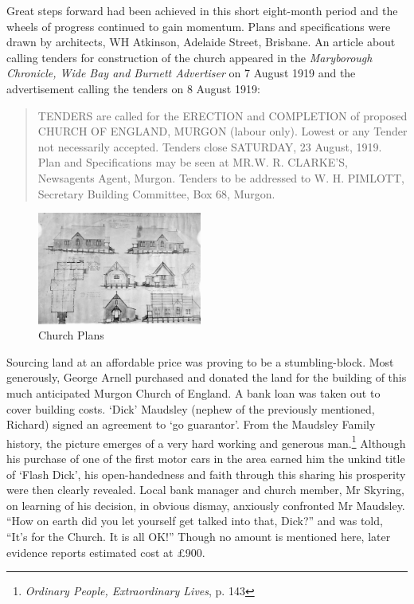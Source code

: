 Great steps forward had been achieved in this short eight-month period
and the wheels of progress continued to gain momentum. Plans and
specifications were drawn by architects, WH Atkinson, Adelaide Street,
Brisbane. An article about calling tenders for construction of the
church appeared in the \emph{Maryborough Chronicle, Wide Bay and Burnett
Advertiser} on 7 August 1919 and the advertisement calling the tenders
on 8 August 1919:

\begin{quote}
TENDERS are called for the ERECTION and COMPLETION of proposed CHURCH OF
ENGLAND, MURGON (labour only). Lowest or any Tender not necessarily
accepted. Tenders close SATURDAY, 23 August, 1919. Plan and
Specifications may be seen at MR.W. R. CLARKE'S, Newsagents Agent,
Murgon. Tenders to be addressed to W. H. PIMLOTT, Secretary Building
Committee, Box 68, Murgon.
\end{quote}




\begin{figure}
\begin{center}
\includegraphics[width=0.48\textwidth,right]{images/churchPlans.jpg}
\caption{Church Plans}
\end{center}
\end{figure}


Sourcing land at an affordable price was proving to be a
stumbling-block. Most generously, George Arnell purchased and donated
the land for the building of this much anticipated Murgon Church of
England. A bank loan was taken out to cover building costs. `Dick'
Maudsley (nephew of the previously mentioned, Richard) signed an
agreement to `go guarantor'. From the Maudsley Family history, the
picture emerges of a very hard working and generous man.\footnote{\emph{Ordinary
  People, Extraordinary Lives}, p. 143} Although his purchase of one of
the first motor cars in the area earned him the unkind title of `Flash
Dick', his open-handedness and faith through this sharing his prosperity
were then clearly revealed. Local bank manager and church member, Mr
Skyring, on learning of his decision, in obvious dismay, anxiously
confronted Mr Maudsley. ``How on earth did you let yourself get talked
into that, Dick?'' and was told, ``It's for the Church. It is all OK!''
Though no amount is mentioned here, later evidence reports estimated
cost at \pounds900.

